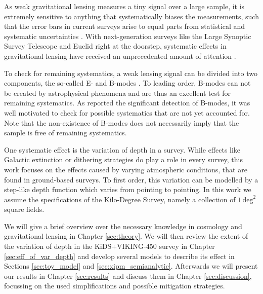 As weak gravitational lensing measures a tiny signal over a large sample, it is extremely sensitive to anything that systematically biases the measurements, such that the error bars in current surveys arise to equal parts from statistical and systematic uncertainties \citep[compare][]{2017MNRAS.465.1454H}. With next-generation surveys like the Large Synoptic Survey Telescope and Euclid right at the doorstep, systematic effects in gravitational lensing have received an unprecedented amount of attention \citep{2018arXiv181002353A,2019arXiv190207439B,2019arXiv190109488S}. %

To check for remaining systematics, a weak lensing signal can be divided into two components, the so-called E- and B-modes \citep{2002ApJ...568...20C,2002A&A...389..729S}. To leading order, B-modes can not be created by astrophysical phenomena and are thus an excellent test for remaining systematics. As \citet{2017MNRAS.465.1454H} reported the significant detection of B-modes, it was well motivated to check for possible systematics that are not yet accounted for. Note that the non-existence of B-modes does not necessarily imply that the sample is free of remaining systematics.

One systematic effect is the variation of depth in a survey. While effects like Galactic extinction or dithering strategies do play a role in every survey, this work focuses on the effects caused by varying atmospheric conditions, that are found in ground-based surveys. To first order, this variation can be modelled by a step-like depth function which varies from pointing to pointing. In this work we assume the specifications of the Kilo-Degree Survey, namely a collection of $1\,\text{deg}^2$ square fields. 

We will give a brief overview over the necessary knowledge in cosmology and gravitational lensing in Chapter \ref{sec:theory}. We will then review the extent of the variation of depth in the KiDS+VIKING-450 survey in Chapter \ref{sec:eff_of_var_depth} and develop several models to describe its effect in Sections \ref{sec:toy_model} and \ref{sec:xipm_semianalytic}. Afterwards we will present our results in Chapter \ref{sec:results} and discuss them in Chapter \ref{sec:discussion}, focussing on the used simplifications and possible mitigation strategies.

